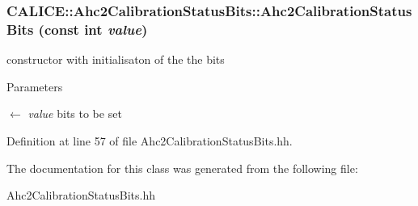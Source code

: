 \subsubsection[{Ahc2CalibrationStatusBits}]{\setlength{\rightskip}{0pt plus 5cm}CALICE::Ahc2CalibrationStatusBits::Ahc2CalibrationStatusBits (const int {\em value})\hspace{0.3cm}{\ttfamily  [inline]}}\label{classCALICE_1_1Ahc2CalibrationStatusBits_a8bc250954688593df06a4b06b2b22915}


constructor with initialisaton of the the bits 
\begin{DoxyParams}{Parameters}
\item[\mbox{$\leftarrow$} {\em value}]bits to be set \end{DoxyParams}


Definition at line 57 of file Ahc2CalibrationStatusBits.hh.

The documentation for this class was generated from the following file:\begin{DoxyCompactItemize}
\item 
Ahc2CalibrationStatusBits.hh\end{DoxyCompactItemize}
